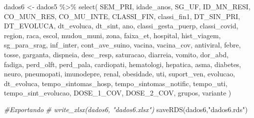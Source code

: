 \documentclass[
]{article}
\newenvironment{Shaded}{\begin{snugshade}}{\end{snugshade}}
\newcommand{\CommentTok}[1]{\textcolor[rgb]{0.56,0.35,0.01}{\textit{#1}}}
\newcommand{\FunctionTok}[1]{\textcolor[rgb]{0.00,0.00,0.00}{#1}}
\newcommand{\NormalTok}[1]{#1}
\newcommand{\OtherTok}[1]{\textcolor[rgb]{0.56,0.35,0.01}{#1}}
\newcommand{\SpecialCharTok}[1]{\textcolor[rgb]{0.00,0.00,0.00}{#1}}
\newcommand{\StringTok}[1]{\textcolor[rgb]{0.31,0.60,0.02}{#1}}
\begin{document}
\begin{Shaded}
\begin{Highlighting}[]
\NormalTok{dados6 }\OtherTok{\textless{}{-}}\NormalTok{ dados5 }\SpecialCharTok{\%\textgreater{}\%} 
  \FunctionTok{select}\NormalTok{(}
\NormalTok{    SEM\_PRI,}
\NormalTok{    idade\_anos,}
\NormalTok{    SG\_UF,}
\NormalTok{    ID\_MN\_RESI,}
\NormalTok{    CO\_MUN\_RES,}
\NormalTok{    CO\_MU\_INTE,}
\NormalTok{    CLASSI\_FIN,}
\NormalTok{    classi\_fin1,}
\NormalTok{    DT\_SIN\_PRI,}
\NormalTok{    DT\_EVOLUCA,}
\NormalTok{    dt\_evoluca, }
\NormalTok{    dt\_sint,}
\NormalTok{    ano,}
\NormalTok{    classi\_gesta\_puerp,}
\NormalTok{    classi\_covid,}
\NormalTok{    region,}
\NormalTok{    raca,}
\NormalTok{    escol,}
\NormalTok{    mudou\_muni,}
\NormalTok{    zona,}
\NormalTok{    faixa\_et,}
\NormalTok{    hospital,}
\NormalTok{    hist\_viagem,}
\NormalTok{    sg\_para\_srag,}
\NormalTok{    inf\_inter,}
\NormalTok{    cont\_ave\_suino,}
\NormalTok{    vacina,}
\NormalTok{    vacina\_cov,}
\NormalTok{    antiviral,}
\NormalTok{    febre,}
\NormalTok{    tosse,}
\NormalTok{    garganta,}
\NormalTok{    dispneia,}
\NormalTok{    desc\_resp,}
\NormalTok{    saturacao,}
\NormalTok{    diarreia,}
\NormalTok{    vomito,}
\NormalTok{    dor\_abd,}
\NormalTok{    fadiga,}
\NormalTok{    perd\_olft,}
\NormalTok{    perd\_pala,}
\NormalTok{    cardiopati,}
\NormalTok{    hematologi,}
\NormalTok{    hepatica,}
\NormalTok{    asma,}
\NormalTok{    diabetes,}
\NormalTok{    neuro,}
\NormalTok{    pneumopati,}
\NormalTok{    imunodepre,}
\NormalTok{    renal,}
\NormalTok{    obesidade,}
\NormalTok{    uti,}
\NormalTok{    suport\_ven,}
\NormalTok{    evolucao,}
\NormalTok{    dt\_evoluca,}
\NormalTok{    tempo\_sintomas\_hosp,}
\NormalTok{    tempo\_sintomas\_notific,}
\NormalTok{    tempo\_uti,}
\NormalTok{    tempo\_sint\_evolucao,}
\NormalTok{    DOSE\_1\_COV,}
\NormalTok{    DOSE\_2\_COV,}
\NormalTok{    grupos,}
\NormalTok{    variante}
\NormalTok{)}

\CommentTok{\#Exportando}
\CommentTok{\# write\_xlsx(dados6, "dados6.xlsx")}
\FunctionTok{saveRDS}\NormalTok{(dados6,}\StringTok{"dados6.rds"}\NormalTok{)}
\end{Highlighting}
\end{Shaded}
\end{document}
